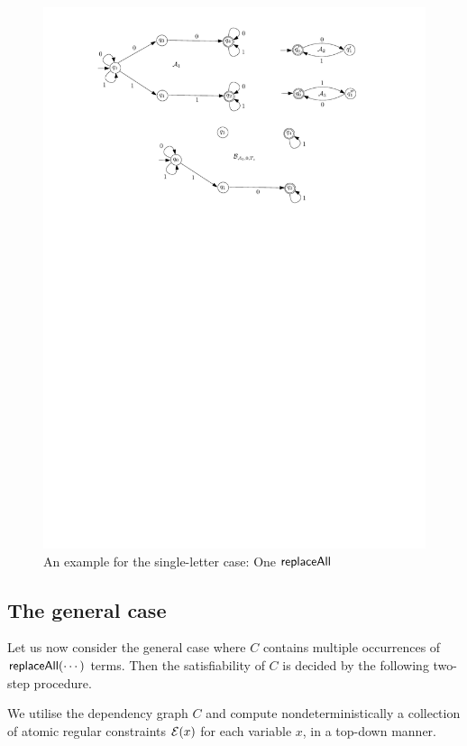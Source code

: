 \begin{example}
\begin{figure}[htbp]
\begin{center}
\includegraphics[scale=0.8]{single-letter-example.pdf}
\end{center}
\caption{An example for the single-letter case: One $\mathsf{replaceAll}$}\label{fig-sl-exmp}
\end{figure}
\end{example}


\subsection{The general case}

Let us now consider the general case where $C$ contains multiple occurrences of $\mathsf{replaceAll}(\cdots)$ terms.
Then the satisfiability of $C$ is decided by the following two-step procedure.

\smallskip

 We utilise the dependency graph $C$ and compute nondeterministically a collection of atomic regular constraints $\mathcal{E}(x)$ for each variable $x$, in a top-down manner.

